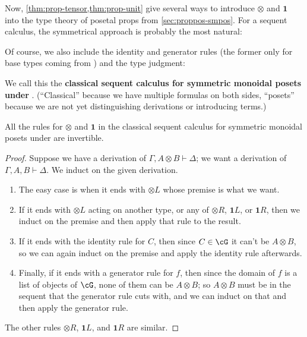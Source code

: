 \documentclass{book}
\let\types\vdash
\def\type{\;\ftype}
\def\unit{\mathbf{1}}
\def\one{\mathbf{1}}
\let\tensor\otimes
\def\tensorL{\mathord{\tensor}L}
\def\tensorR{\mathord{\tensor}R}
\begin{document}
Now, \cref{thm:prop-tensor,thm:prop-unit} give several ways to introduce $\tensor$ and $\unit$ into the type theory of posetal props from \ref{sec:proppos-smpos}.
For a sequent calculus, the symmetrical approach is probably the most natural:
Of course, we also include the identity and generator rules (the former only for base types coming from \cG) and the type judgment:
We call this the \textbf{classical sequent calculus for symmetric monoidal posets under \cG}.
(``Classical'' because we have multiple formulas on both sides, ``posets'' because we are not yet distinguishing derivations or introducing terms.)

\begin{thm}\label{thm:seqcalc-smpos-invertible}
  All the rules for $\tensor$ and $\one$ in the classical sequent calculus for symmetric monoidal posets under \cG are invertible.
\end{thm}
\begin{proof}
  Suppose we have a derivation of $\Gamma,A\tensor B\types \Delta$; we want a derivation of $\Gamma,A,B\types \Delta$.
  We induct on the given derivation.
  \begin{enumerate}
  \item The easy case is when it ends with $\tensorL$ whose premise is what we want.
  \item If it ends with $\tensorL$ acting on another type, or any of $\tensorR$, $\one L$, or $\one R$, then we induct on the premise and then apply that rule to the result.
  \item If it ends with the identity rule for $C$, then since $C\in \cG$ it can't be $A\tensor B$, so we can again induct on the premise and apply the identity rule afterwards.
  \item Finally, if it ends with a generator rule for $f$, then since the domain of $f$ is a list of objects of $\cG$, none of them can be $A\tensor B$; so $A\tensor B$ must be in the sequent that the generator rule cuts with, and we can induct on that and then apply the generator rule.
  \end{enumerate}
  The other rules $\tensorR$, $\one L$, and $\one R$ are similar.
\end{proof}
\end{document}
